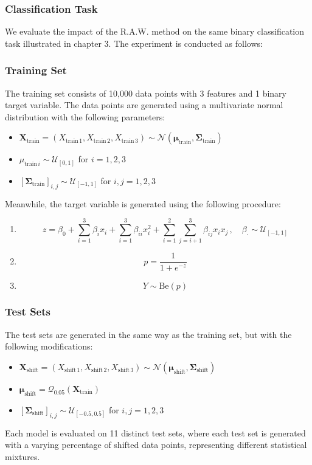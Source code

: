 \subsubsection{\textbf{Classification Task}}

We evaluate the impact of the R.A.W. method on the same binary classification task illustrated in chapter 3. The experiment is conducted as follows:
\subsubsection{Training Set}
The training set consists of 10,000 data points with 3 features and 1 binary target variable. The data points are generated using a multivariate normal distribution with the following parameters:

\begin{itemize}
    \item $ \boldsymbol{X}_{\text{train}} = (X_{\text{train}\,1}, X_{\text{train}\,2}, X_{\text{train}\,3}) \sim \mathcal{N}(\boldsymbol{\mu}_{\text{train}}, \boldsymbol{\Sigma}_{\text{train}}) $
    \item $ \mu_{\text{train}\,i} \sim \mathcal{U}_{[0,1]} $ for $ i = 1, 2, 3 $
    \item $ [\boldsymbol{\Sigma}_{\text{train}}]_{i,j} \sim \mathcal{U}_{[-1,1]} $ for $ i, j = 1, 2, 3 $
\end{itemize}

Meanwhile, the target variable is generated using the following procedure:

\begin{enumerate}
    \item $$ 
    z = \beta_0 + \sum_{i=1}^3 \beta_i x_i + \sum_{i=1}^3 \beta_{ii} x_i^2 + \sum_{i=1}^{2} \sum_{j=i+1}^3 \beta_{ij} x_i x_j\,,   \quad \beta_{\cdot} \sim \mathcal{U}_{[-1,1]}
    $$
    \item $$ p = \frac{1}{1 + e^{-z}}$$
    \item $$ Y \sim \text{Be}(p)$$
\end{enumerate}

\subsubsection{Test Sets}
The test sets are generated in the same way as the training set, but with the following modifications:

\begin{itemize}
    \item $ \boldsymbol{X}_{\text{shift}} = (X_{\text{shift}\,1}, X_{\text{shift}\,2}, X_{\text{shift}\,3}) \sim \mathcal{N}(\boldsymbol{\mu}_{\text{shift}}, \boldsymbol{\Sigma}_{\text{shift}}) $
    \item $ \boldsymbol{\mu}_{\text{shift}} = \mathcal{Q}_{0.05}(\boldsymbol{X}_{\text{train}})$
    \item $ [\boldsymbol{\Sigma}_{\text{shift}}]_{i,j} \sim \mathcal{U}_{[-0.5,0.5]} $ for $ i, j = 1, 2, 3 $
\end{itemize}
Each model is evaluated on 11 distinct test sets, where each test set is generated with a varying percentage of shifted data points, representing different statistical mixtures.

